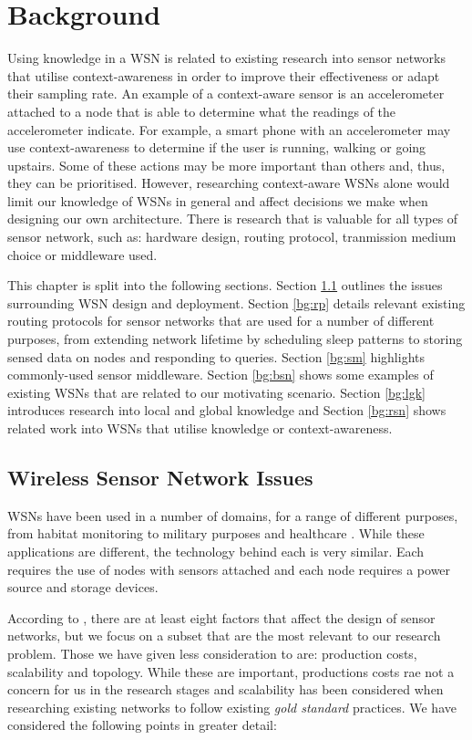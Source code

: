 \chapter{Background}\label{chap:bg}
Using knowledge in a WSN is related to existing research into sensor networks that utilise context-awareness in order to improve their effectiveness or adapt their sampling rate. An example of a context-aware sensor is an accelerometer attached to a node that is able to determine what the readings of the accelerometer indicate. For example, a smart phone with an accelerometer may use context-awareness to determine if the user is running, walking or going upstairs. Some of these actions may be more important than others and, thus, they can be prioritised. However, researching context-aware WSNs alone would limit our knowledge of WSNs in general and affect decisions we make when designing our own architecture. There is research that is valuable for all types of sensor network, such as: hardware design, routing protocol, tranmission medium choice or middleware used.

This chapter is split into the following sections. Section \ref{bg:wsni} outlines the issues surrounding WSN design and deployment. 
Section \ref{bg:rp} details relevant existing routing protocols for sensor networks that are used for a number of different purposes, from extending network lifetime by scheduling sleep patterns to storing sensed data on nodes and responding to queries. Section \ref{bg:sm} highlights commonly-used sensor middleware. Section \ref{bg:bsn} shows some examples of existing WSNs that are related to our motivating scenario. Section \ref{bg:lgk} introduces research into local and global knowledge and Section \ref{bg:rsn} shows related work into WSNs that utilise knowledge or context-awareness.

\section{Wireless Sensor Network Issues} \label{bg:wsni}

WSNs have been used in a number of domains, for a range of different purposes, from habitat monitoring \cite{Szewczyk2004a} to military purposes \cite{Pizzocaro} and healthcare \cite{Otto2006}. While these applications are different, the technology behind each is very similar. Each requires the use of nodes with sensors attached and each node requires a power source and storage devices.

According to \cite{Akyildiz2002}, there are at least eight factors that affect the design of sensor networks, but we focus on a subset that are the most relevant to our research problem. Those we have given less consideration to are: production costs, scalability and topology. While these are important, productions costs rae not a concern for us in the research stages and scalability has been considered when researching existing networks to follow existing \textit{gold standard} practices. We have considered the following points in greater detail:

